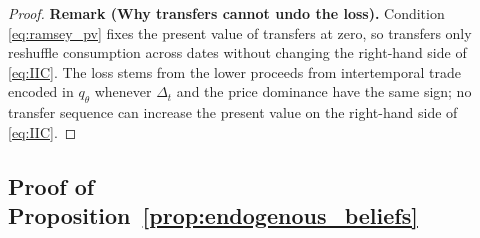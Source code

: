 \documentclass[12pt]{article}
\theoremstyle{plain}
\begin{document}
\begin{proof}
	\smallskip
	\textbf{Remark (Why transfers cannot undo the loss).}
	Condition \eqref{eq:ramsey_pv} fixes the present value of transfers at zero, so
	transfers only reshuffle consumption across dates without changing the
	right-hand side of \eqref{eq:IIC}. The loss stems from the lower proceeds from
	intertemporal trade encoded in $q_\theta$ whenever $\Delta_t$ and the
	price dominance have the same sign; no transfer sequence can increase the
	present value on the right-hand side of \eqref{eq:IIC}.
\end{proof}

\subsection{Proof of Proposition~\ref{prop:endogenous_beliefs}}\label{app:proof_endogenous_beliefs}
\end{document}
